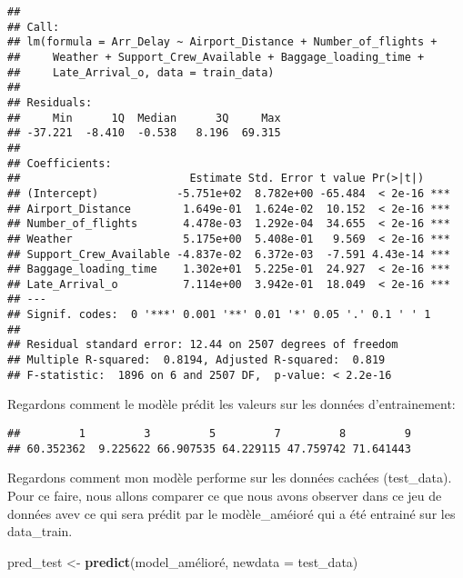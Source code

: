\documentclass[
]{article}
\newenvironment{Shaded}{\begin{snugshade}}{\end{snugshade}}
\newcommand{\AttributeTok}[1]{\textcolor[rgb]{0.13,0.29,0.53}{#1}}
\newcommand{\FunctionTok}[1]{\textcolor[rgb]{0.13,0.29,0.53}{\textbf{#1}}}
\newcommand{\NormalTok}[1]{#1}
\newcommand{\OtherTok}[1]{\textcolor[rgb]{0.56,0.35,0.01}{#1}}
\newcommand{\SpecialCharTok}[1]{\textcolor[rgb]{0.81,0.36,0.00}{\textbf{#1}}}
\begin{document}
\begin{verbatim}
## 
## Call:
## lm(formula = Arr_Delay ~ Airport_Distance + Number_of_flights + 
##     Weather + Support_Crew_Available + Baggage_loading_time + 
##     Late_Arrival_o, data = train_data)
## 
## Residuals:
##     Min      1Q  Median      3Q     Max 
## -37.221  -8.410  -0.538   8.196  69.315 
## 
## Coefficients:
##                          Estimate Std. Error t value Pr(>|t|)    
## (Intercept)            -5.751e+02  8.782e+00 -65.484  < 2e-16 ***
## Airport_Distance        1.649e-01  1.624e-02  10.152  < 2e-16 ***
## Number_of_flights       4.478e-03  1.292e-04  34.655  < 2e-16 ***
## Weather                 5.175e+00  5.408e-01   9.569  < 2e-16 ***
## Support_Crew_Available -4.837e-02  6.372e-03  -7.591 4.43e-14 ***
## Baggage_loading_time    1.302e+01  5.225e-01  24.927  < 2e-16 ***
## Late_Arrival_o          7.114e+00  3.942e-01  18.049  < 2e-16 ***
## ---
## Signif. codes:  0 '***' 0.001 '**' 0.01 '*' 0.05 '.' 0.1 ' ' 1
## 
## Residual standard error: 12.44 on 2507 degrees of freedom
## Multiple R-squared:  0.8194, Adjusted R-squared:  0.819 
## F-statistic:  1896 on 6 and 2507 DF,  p-value: < 2.2e-16
\end{verbatim}

Regardons comment le modèle prédit les valeurs sur les données
d'entrainement:

\begin{Shaded}
\end{Shaded}

\begin{verbatim}
##         1         3         5         7         8         9 
## 60.352362  9.225622 66.907535 64.229115 47.759742 71.641443
\end{verbatim}

Regardons comment mon modèle performe sur les données cachées
(test\_data). Pour ce faire, nous allons comparer ce que nous avons
observer dans ce jeu de données avev ce qui sera prédit par le
modèle\_améioré qui a été entrainé sur les data\_train.

\begin{Shaded}
\begin{Highlighting}[]
\NormalTok{pred\_test }\OtherTok{\textless{}{-}} \FunctionTok{predict}\NormalTok{(model\_amélioré, }\AttributeTok{newdata =}\NormalTok{ test\_data)}
\end{Highlighting}
\end{Shaded}
\end{document}
